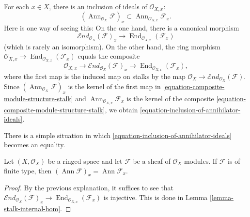 \medskip\noindent
For each $x\in X$, there is an inclusion of ideals of $\mathcal{O}_{X,x}$:
\begin{equation}
	\label{equation-inclusion-of-annihilator-ideals}
	(\operatorname{Ann}_{\mathcal{O}_X}\mathcal{F})_x\subset
	\operatorname{Ann}_{\mathcal{O}_{X,x}}\mathcal{F}_x.
\end{equation}
Here is one way of seeing this:
On the one hand, there is a canonical morphism
$$
\mathcal{E}nd_{\mathcal{O}_X}(\mathcal{F})_x\to
\operatorname{End}_{\mathcal{O}_{X,x}}(\mathcal{F}_x)
$$
(which is rarely an isomorphism).
On the other hand, the ring morphism
$\mathcal{O}_{X,x}\to
\operatorname{End}_{\mathcal{O}_{X,x}}(\mathcal{F}_x)$ equals the composite
\begin{equation}
	\label{equation-composite-module-structure-stalk}
	\mathcal{O}_{X,x}\to
	\mathcal{E}nd_{\mathcal{O}_X}(\mathcal{F})_x\to
	\operatorname{End}_{\mathcal{O}_{X,x}}(\mathcal{F}_x),
\end{equation}
where the first map is the induced map on stalks by the map
$\mathcal{O}_{X}\to
\mathcal{E}nd_{\mathcal{O}_X}(\mathcal{F})$.
Since $(\operatorname{Ann}_{\mathcal{O}_X}\mathcal{F})_x$
is the kernel of the first map in
\eqref{equation-composite-module-structure-stalk} and
$\operatorname{Ann}_{\mathcal{O}_{X,x}}\mathcal{F}_x$ is the kernel of
the composite \eqref{equation-composite-module-structure-stalk},
we obtain \eqref{equation-inclusion-of-annihilator-ideals}.

\medskip\noindent
There is a simple situation in which
\eqref{equation-inclusion-of-annihilator-ideals} becomes an equality.
\begin{lemma}
	Let $(X,\mathcal{O}_X)$ be a ringed space and let
	$\mathcal{F}$ be a sheaf of $\mathcal{O}_X$-modules.
	If $\mathcal{F}$ is of finite type, then
	$(\operatorname{Ann}\mathcal{F})_x
	=\operatorname{Ann}\mathcal{F}_x$.
\end{lemma}
\begin{proof}
	By the previous explanation,
	it suffices to see that
	$\mathcal{E}nd_{\mathcal{O}_X}(\mathcal{F})_x\to
	\operatorname{End}_{\mathcal{O}_{X,x}}(\mathcal{F}_x)$ is injective.
	This is done in Lemma \ref{lemma-stalk-internal-hom}.
\end{proof}

